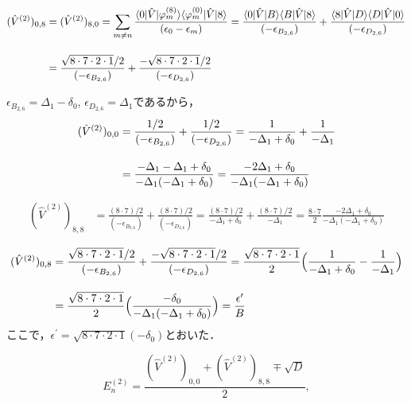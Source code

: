 \begin{align}
    (\hat{V}^{(2)})_{0,8}
    &=(\hat{V}^{(2)})_{8,0}
    =\sum_{m\neq n}
    \frac{\langle{0|\hat{V}|\varphi^{(8)}_m}\rangle
    \langle{\varphi^{(0)}_{m}|\hat{V}|8}\rangle}
    {(\epsilon_0-\epsilon_m)}
    =
    \frac{\langle{0|\hat{V}|B}\rangle
    \langle{B|\hat{V}|8}\rangle}
    {(-\epsilon_{B_{2,6}})}
    +\frac{\langle{8|\hat{V}|D}\rangle
    \langle{D|\hat{V}|0}\rangle}
    {(-\epsilon_{D_{2,6}})}\nn[10pt]
    & =
    \frac{\sqrt{8\cdot7\cdot2\cdot1}/2}
    {(-\epsilon_{B_{2,6}})}
    +\frac{-\sqrt{8\cdot7\cdot2\cdot1}/2}
    {(-\epsilon_{D_{2,6}})}
\end{align}





$\epsilon_{B_{2,6}} = \Delta_1 - \delta_0$, $\epsilon_{D_{2,6}}=\Delta_1$であるから，
\begin{align}
    (\hat{V}^{(2)})_{0,0}
    &
    =\frac{1 / 2}
    {(-\epsilon_{B_{2,6}})}
    +\frac{1 / 2}
    {(-\epsilon_{D_{2,6}})}
    =\frac{1}
    {-\Delta_1 + \delta_0}
    +\frac{1}
    {-\Delta_1}\nn[10pt]
    &
    =\frac{-\Delta_1-\Delta_1 + \delta_0}{-\Delta_1(-\Delta_1 + \delta_0)}
    =\frac{-2\Delta_1 + \delta_0}{-\Delta_1(-\Delta_1 + \delta_0)}
\end{align}


\begin{align}
    (\hat{V}^{(2)})_{8,8}
    &
    =\frac{(8\cdot7) / 2}
    {(-\epsilon_{B_{2,6}})}
    +\frac{(8\cdot7) / 2}
    {(-\epsilon_{D_{2,6}})}
    =\frac{(8\cdot7) / 2}
    {-\Delta_1 + \delta_0}
    +\frac{(8\cdot7) / 2}
    {-\Delta_1}
    =\frac{8\cdot7}{2}\frac{-2\Delta_1 + \delta_0}{-\Delta_1(-\Delta_1 + \delta_0)}
\end{align}




\begin{align}
    (\hat{V}^{(2)})_{0,8}
    & =
    \frac{\sqrt{8\cdot7\cdot2\cdot1}/2}
    {(-\epsilon_{B_{2,6}})}
    +\frac{-\sqrt{8\cdot7\cdot2\cdot1}/2}
    {(-\epsilon_{D_{2,6}})}
    =\frac{\sqrt{8\cdot7\cdot2\cdot1}}{2}
    \Bigl(
    \frac{1}
    {-\Delta_1 + \delta_0}
    -\frac{1}
    {-\Delta_1}
    \Bigr)
    \nn[10pt]
    &=\frac{\sqrt{8\cdot7\cdot2\cdot1}}{2}
    \Bigl(
    \frac{-\delta_0}
    {-\Delta_1(-\Delta_1 + \delta_0)}
    \Bigr)
    =\frac{\epsilon^{\prime}}{B}
\end{align}
ここで，$\epsilon^{\prime}=\sqrt{8\cdot7\cdot2\cdot1}(-\delta_0)$とおいた．

\begin{equation}
    E^{(2)}_n=\frac{
    (\hat{V}^{(2)})_{0,0} + (\hat{V}^{(2)})_{8,8}
    \mp \sqrt{D}
    }{2},
\end{equation}

